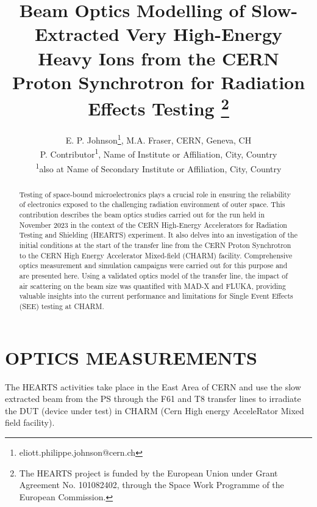 \documentclass[a4paper,
               ]{jacow}
\begin{document}
\title{Beam Optics Modelling of Slow-Extracted Very High-Energy Heavy Ions from the CERN Proton Synchrotron for Radiation Effects Testing \thanks{The HEARTS project is funded by the European Union under Grant Agreement No. 101082402, through the Space Work Programme of the European Commission.}}

\author{E. P. Johnson\thanks{eliott.philippe.johnson@cern.ch}, M.A. Fraser, CERN, Geneva, CH \\
		P. Contributor\textsuperscript{1}, Name of Institute or Affiliation, City, Country \\
		\textsuperscript{1}also at Name of Secondary Institute or Affiliation, City, Country}
	
\maketitle

%
\begin{abstract}
   Testing of space-bound microelectronics plays a crucial role in ensuring the reliability of electronics exposed to the challenging radiation environment of outer space. This contribution describes the beam optics studies carried out for the run held in November 2023 in the context of the CERN High-Energy Accelerators for Radiation Testing and Shielding (HEARTS) experiment. It also delves into an investigation of the initial conditions at the start of the transfer line from the CERN Proton Synchrotron to the CERN High Energy Accelerator Mixed-field (CHARM) facility. Comprehensive optics measurement and simulation campaigns were carried out for this purpose and are presented here. Using a validated optics model of the transfer line, the impact of air scattering on the beam size was quantified with MAD-X and FLUKA, providing valuable insights into the current performance and limitations for Single Event Effects (SEE) testing at CHARM.
\end{abstract}



\section{OPTICS MEASUREMENTS}

The HEARTS activities take place in the East Area of CERN and use the slow extracted beam from the PS through the F61 and T8 transfer lines to irradiate the DUT (device under test) in CHARM (Cern High energy AcceleRator Mixed field facility).
\end{document}
